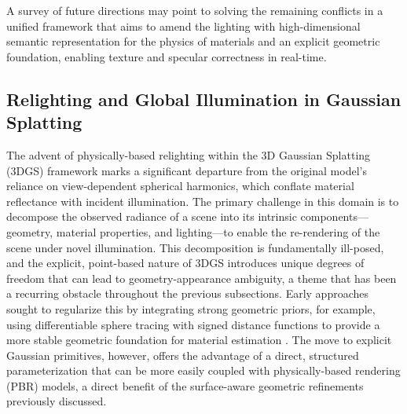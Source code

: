\documentclass[11pt,a4paper]{article}
\begin{document}
A survey of future directions may point to solving the remaining conflicts in a unified framework that aims to amend the lighting with high-dimensional semantic representation for the physics of materials and an explicit geometric foundation, enabling texture and specular correctness in real-time.


\subsection{Relighting and Global Illumination in Gaussian Splatting}


The advent of physically-based relighting within the 3D Gaussian Splatting (3DGS) framework marks a significant departure from the original model's reliance on view-dependent spherical harmonics, which conflate material reflectance with incident illumination. The primary challenge in this domain is to decompose the observed radiance of a scene into its intrinsic components---geometry, material properties, and lighting---to enable the re-rendering of the scene under novel illumination. This decomposition is fundamentally ill-posed, and the explicit, point-based nature of 3DGS introduces unique degrees of freedom that can lead to geometry-appearance ambiguity, a theme that has been a recurring obstacle throughout the previous subsections. Early approaches sought to regularize this by integrating strong geometric priors, for example, using differentiable sphere tracing with signed distance functions to provide a more stable geometric foundation for material estimation \cite{arxiv:1911.13225v2,arxiv:2106.03452v2}. The move to explicit Gaussian primitives, however, offers the advantage of a direct, structured parameterization that can be more easily coupled with physically-based rendering (PBR) models, a direct benefit of the surface-aware geometric refinements previously discussed.
\end{document}
